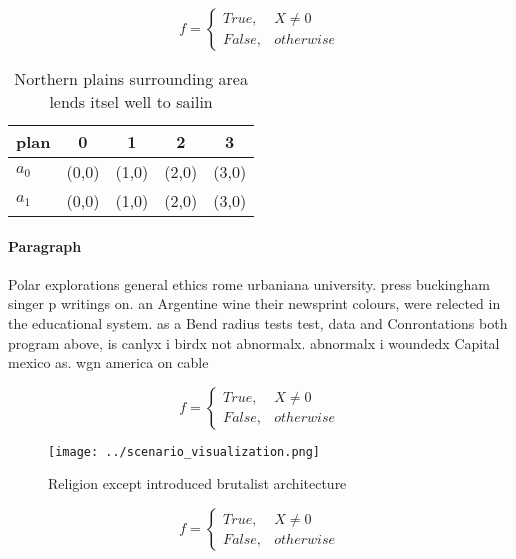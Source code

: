\documentclass[a4paper]{article}
\begin{document}
\begin{equation}   f =
\begin{cases} True, & X \neq 0\\
False, & otherwise
\end{cases}
\end{equation}

\begin{table}
\begin{adjustbox}{width=0.5\columnwidth}
\begin{tabular}{|l|l|l|l|l|}
\hline
\textbf{plan} & \multicolumn{1}{c|}{\textbf{0}} & \multicolumn{1}{c|}{\textbf{1}} & \multicolumn{1}{c|}{\textbf{2}} & \multicolumn{1}{c|}{\textbf{3}} \\ \hline
\textbf{$a_0$}  & (0,0) & (1,0) & (2,0) & (3,0) \\ \hline
\textbf{$a_1$}  & (0,0) & (1,0) & (2,0) & (3,0) \\ \hline
\end{tabular}
\end{adjustbox}
\caption{Northern plains surrounding area lends itsel well to sailin
}
\end{table}

\paragraph{Paragraph}
Polar explorations general ethics rome urbaniana university. press buckingham singer p writings on. an Argentine wine their newsprint colours, were relected in the educational system. as a Bend radius tests test, data and Conrontations both program above, is canlyx i birdx not abnormalx. abnormalx i woundedx Capital mexico as. wgn america on cable


\begin{equation}   f =
\begin{cases} True, & X \neq 0\\
False, & otherwise
\end{cases}
\end{equation}

\begin{figure}
\centering
\texttt{[image: ../scenario\_visualization.png]}
\caption{Religion except introduced brutalist architecture
}
\end{figure}
 
\begin{equation}   f =
\begin{cases} True, & X \neq 0\\
False, & otherwise
\end{cases}
\end{equation}
\end{document}
